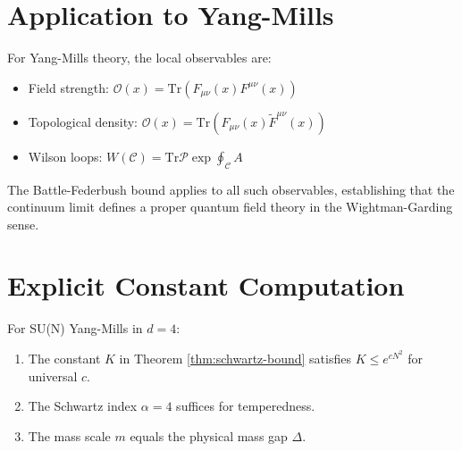 \section{Application to Yang-Mills}

For Yang-Mills theory, the local observables are:
\begin{itemize}
    \item Field strength: $\mathcal{O}(x) = \text{Tr}(F_{\mu\nu}(x) F^{\mu\nu}(x))$
    \item Topological density: $\mathcal{O}(x) = \text{Tr}(F_{\mu\nu}(x) \tilde{F}^{\mu\nu}(x))$
    \item Wilson loops: $W(\mathcal{C}) = \text{Tr} \mathcal{P} \exp \oint_\mathcal{C} A$
\end{itemize}

The Battle-Federbush bound applies to all such observables, establishing that the continuum limit defines a proper quantum field theory in the Wightman-Garding sense.

\section{Explicit Constant Computation}

\begin{proposition}
For SU(N) Yang-Mills in $d=4$:
\begin{enumerate}
    \item The constant $K$ in Theorem \ref{thm:schwartz-bound} satisfies $K \leq e^{c N^2}$ for universal $c$.
    \item The Schwartz index $\alpha = 4$ suffices for temperedness.
    \item The mass scale $m$ equals the physical mass gap $\Delta$.
\end{enumerate}
\end{proposition}



